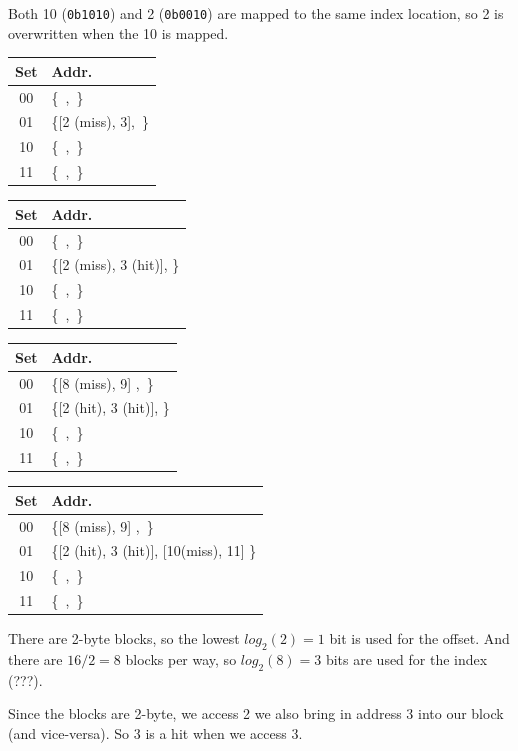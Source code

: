 \documentclass{article}
\begin{document}
Both 10 (\texttt{0b1010}) and 2 (\texttt{0b0010}) are mapped to the same index location, so 2 is overwritten when the 10 is mapped. 


\begin{table}[H]
\centering
\scriptsize
\begin{tabular}{cl}
\toprule
\textbf{Set} & \textbf{Addr.} \\
\midrule
00 & \{\ ,\ \} \\
01 & \{[2 (miss), 3],\ \} \\
10 & \{\ ,\ \} \\
11 & \{\ ,\ \} \\
\toprule
\end{tabular}
\quad
\begin{tabular}{cl}
\toprule
\textbf{Set} & \textbf{Addr.} \\
\midrule
00 & \{\ ,\ \} \\
01 & \{[2 (miss), 3 (hit)],  \} \\
10 & \{\ ,\ \} \\
11 & \{\ ,\ \} \\
\toprule
\end{tabular}
\quad
\begin{tabular}{cl}
\toprule
\textbf{Set} & \textbf{Addr.} \\
\midrule
00 & \{[8 (miss), 9] ,\ \} \\
01 & \{[2 (hit), 3 (hit)],  \} \\
10 & \{\ ,\ \} \\
11 & \{\ ,\ \} \\
\toprule
\end{tabular}
\quad
\begin{tabular}{cl}
\toprule
\textbf{Set} & \textbf{Addr.} \\
\midrule
00 & \{[8 (miss), 9] ,\ \} \\
01 & \{[2 (hit), 3 (hit)],  [10(miss), 11] \} \\
10 & \{\ ,\ \} \\ 
11 & \{\ ,\ \} \\
\toprule
\end{tabular}
\quad
\end{table}

There are 2-byte blocks, so the lowest $log_2(2) = 1$ bit is used for the offset. And there are $16/2 = 8$ blocks per way, so $log_2(8) = 3$ bits are used for the index (???).

Since the blocks are 2-byte, we access 2 we also bring in address 3 into our block (and vice-versa). So 3 is a hit when we access 3. 
\end{document}
